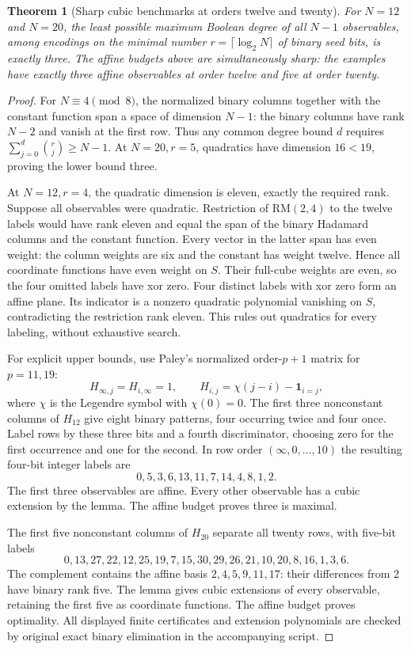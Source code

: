 \documentclass[11pt]{article}
\newtheorem{theorem}{Theorem}[section]
\begin{document}
\begin{theorem}[Sharp cubic benchmarks at orders twelve and twenty]
\label{thm:nonlinear-cubic}
For $N=12$ and $N=20$, the least possible maximum Boolean degree of
all $N-1$ observables, among encodings on the minimal number
$r=\lceil\log_2N\rceil$ of binary seed bits, is exactly three.
The affine budgets above are simultaneously sharp: the examples have
exactly three affine observables at order twelve and five at order twenty.
\end{theorem}
\begin{proof}
For $N\equiv4\pmod8$, the normalized binary columns together with the
constant function span a space of dimension $N-1$: the binary columns
have rank $N-2$ and vanish at the first row. Thus any common degree
bound $d$ requires
$\sum_{j=0}^d\binom rj\ge N-1$.
At $N=20,r=5$, quadratics have dimension $16<19$, proving the lower
bound three.

At $N=12,r=4$, the quadratic dimension is eleven, exactly the required
rank. Suppose all observables were quadratic. Restriction of
$\mathrm{RM}(2,4)$ to the twelve labels would have rank eleven and equal
the span of the binary Hadamard columns and the constant function.
Every vector in the latter span has even weight: the column weights
are six and the constant has weight twelve. Hence all coordinate
functions have even weight on $S$. Their full-cube weights are even,
so the four omitted labels have xor zero. Four distinct labels with xor
zero form an affine plane. Its indicator is a nonzero quadratic
polynomial vanishing on $S$, contradicting the restriction rank eleven.
This rules out quadratics for every labeling, without exhaustive search.

For explicit upper bounds, use Paley's normalized order-$p+1$ matrix
for $p=11,19$:
\[
 H_{\infty,j}=H_{i,\infty}=1,\qquad
 H_{i,j}=\chi(j-i)-\mathbf1_{i=j},
\]
where $\chi$ is the Legendre symbol with $\chi(0)=0$.
The first three nonconstant columns of $H_{12}$ give eight binary
patterns, four occurring twice and four once. Label rows by these
three bits and a fourth discriminator, choosing zero for the first
occurrence and one for the second. In row order $(\infty,0,\ldots,10)$
the resulting four-bit integer labels are
\[
 0,5,3,6,13,11,7,14,4,8,1,2.
\]
The first three observables are affine. Every other observable has a
cubic extension by the lemma. The affine budget proves three is maximal.

The first five nonconstant columns of $H_{20}$ separate all twenty
rows, with five-bit labels
\[
 0,13,27,22,12,25,19,7,15,30,29,26,21,10,20,8,16,1,3,6.
\]
The complement contains the affine basis
$2,4,5,9,11,17$: their differences from $2$ have binary rank five.
The lemma gives cubic extensions of every observable, retaining the
first five as coordinate functions. The affine budget proves optimality.
All displayed finite certificates and extension polynomials are checked
by original exact binary elimination in the accompanying script.
\end{proof}
\end{document}
